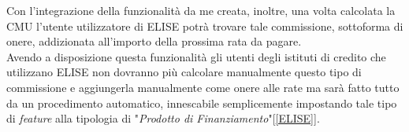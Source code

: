 	Con l'integrazione della funzionalità da me creata, inoltre, una volta calcolata la CMU l'utente utilizzatore di ELISE potrà trovare tale commissione, sottoforma di onere, addizionata all'importo della prossima rata da pagare.\\
	
	Avendo a disposizione questa funzionalità gli utenti degli istituti di credito che utilizzano ELISE non dovranno più calcolare manualmente questo tipo di commissione e aggiungerla manualmente come onere alle rate ma sarà fatto tutto da un procedimento automatico, innescabile semplicemente impostando tale tipo di \textit{feature} alla tipologia di "\textit{Prodotto di Finanziamento}"[\ref{ELISE}].